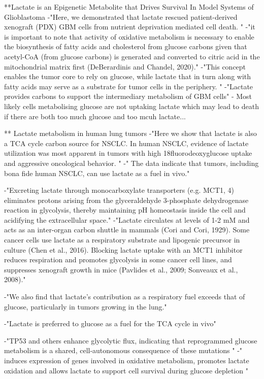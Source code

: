 \documentclass[11pt,a4paper]{article}
\begin{document}
**Lactate is an Epigenetic Metabolite that Drives Survival In Model Systems of Glioblastoma
-"Here, we demonstrated that lactate rescued patient-derived xenograft (PDX) GBM cells from nutrient deprivation mediated cell death. "
-"it is important to note that activity of oxidative metabolism is necessary to enable the biosynthesis of fatty acids and cholesterol from glucose carbons given that acetyl-CoA (from glucose carbons) is generated and converted to citric acid in the mitochondrial matrix first (DeBerardinis and Chandel, 2020)."
-"This concept enables the tumor core to rely on glucose, while lactate that in turn along with fatty acids may serve as a substrate for tumor cells in the periphery. "
-"Lactate provides carbons to support the intermediary metabolism of GBM cells"
- Most likely  cells metabolising glucose are not uptaking lactate which may lead to death if there are both too much glucose and too mcuh lactate...

** Lactate metabolism in human lung tumors
-"Here we show that lactate is also a TCA cycle carbon source for NSCLC. In human NSCLC, evidence of lactate utilization was most apparent in tumors with high 18fluorodeoxyglucose uptake and aggressive oncological behavior. "
-" The data indicate that tumors, including bona fide human NSCLC, can use lactate as a fuel in vivo."

-"Excreting lactate through monocarboxylate transporters (e.g. MCT1, 4) eliminates protons arising from the glyceraldehyde 3-phosphate dehydrogenase reaction in glycolysis, thereby maintaining pH homeostasis inside the cell and acidifying the extracellular space."
-"Lactate circulates at levels of 1-2 mM and acts as an inter-organ carbon shuttle in mammals (Cori and Cori, 1929). Some cancer cells use lactate as a respiratory substrate and lipogenic precursor in culture (Chen et al., 2016). Blocking lactate uptake with an MCT1 inhibitor reduces respiration and promotes glycolysis in some cancer cell lines, and suppresses xenograft growth in mice (Pavlides et al., 2009; Sonveaux et al., 2008)."

-"We also find that lactate's contribution as a respiratory fuel exceeds that of glucose, particularly in tumors growing in the lung."

-"Lactate is preferred to glucose as a fuel for the TCA cycle in vivo"

-"TP53 and others enhance glycolytic flux, indicating that reprogrammed glucose metabolism is a shared, cell-autonomous consequence of these mutations "
-" induces expression of genes involved in oxidative metabolism, promotes lactate oxidation and allows lactate to support cell survival during glucose depletion "
\end{document}
